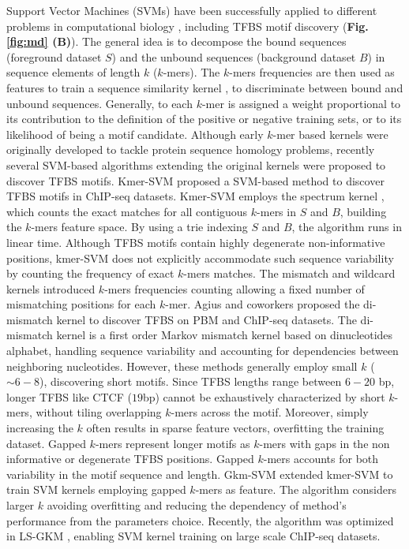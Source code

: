 \documentclass[a4paper, titlepage, openright]{book}
\begin{document}
Support Vector Machines (SVMs) \citep{boser1992training} have been successfully applied to different problems in computational biology \citep{ben2008support}, including TFBS motif discovery (\textbf{Fig.\ref{fig:md} (B)}). The general idea is to decompose the bound sequences (foreground dataset $S$) and the unbound sequences (background dataset $B$) in sequence elements of length $k$ ($k$-mers). The $k$-mers frequencies are then used as features to train a sequence similarity kernel \citep{ben2008support}, to discriminate between bound and unbound sequences. Generally, to each $k$-mer is assigned a weight proportional to its contribution to the definition of the positive or negative training sets, or to its likelihood of being a motif candidate. Although early $k$-mer based kernels \citep{leslie2001spectrum,eskin2002mismatch,kuang2005profile} were originally developed to tackle protein sequence homology problems, recently several SVM-based algorithms extending the original kernels were proposed to discover TFBS motifs. Kmer-SVM \citep{lee2011discriminative,fletez2013kmer} proposed a SVM-based method to discover TFBS motifs in ChIP-seq datasets. Kmer-SVM employs the spectrum kernel \citep{leslie2001spectrum}, which counts the exact matches for all contiguous $k$-mers in $S$ and $B$, building the $k$-mers feature space. By using a trie \citep{bodon2003trie} indexing $S$ and $B$, the algorithm runs in linear time. Although TFBS motifs contain highly degenerate non-informative positions, kmer-SVM does not explicitly accommodate such sequence variability by counting the frequency of exact $k$-mers matches. The mismatch and wildcard kernels \citep{kuang2005profile,leslie2003fast} introduced $k$-mers frequencies counting allowing a fixed number of mismatching positions for each $k$-mer. Agius and coworkers \citep{agius2010high} proposed the di-mismatch kernel to discover TFBS on PBM and ChIP-seq datasets. The di-mismatch kernel is a first order Markov mismatch kernel based on dinucleotides alphabet, handling sequence variability and accounting for dependencies between neighboring nucleotides. However, these methods generally employ small $k$ ($\sim6-8$), discovering short motifs. Since TFBS lengths range between $6-20$ bp, longer TFBS like CTCF ($19$bp) cannot be exhaustively characterized by short $k$-mers, without tiling overlapping $k$-mers across the motif. Moreover, simply increasing the $k$ often results in sparse feature vectors, overfitting the training dataset. Gapped $k$-mers \citep{ghandi2014robust} represent longer motifs as $k$-mers with gaps in the non informative or degenerate TFBS positions. Gapped $k$-mers accounts for both variability in the motif sequence and length. Gkm-SVM \citep{ghandi2014enhanced,ghandi2016gkmsvm} extended kmer-SVM to train SVM kernels employing gapped $k$-mers as feature. The algorithm considers larger $k$ avoiding overfitting and reducing the dependency of method’s performance from the parameters choice. Recently, the algorithm was optimized in LS-GKM \citep{lee2016ls}, enabling SVM kernel training on large scale ChIP-seq datasets.
\end{document}
